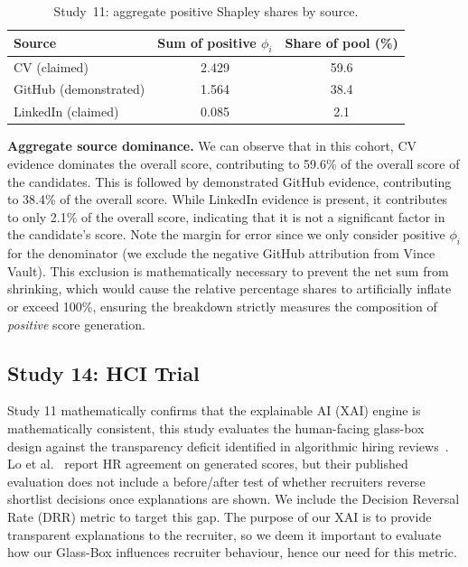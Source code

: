 \begin{table}[htbp]
    \centering
    \caption[Study~11: Aggregate Shapley by source]{Study~11: aggregate positive Shapley shares by source.}
    \label{tab:shapley-source-dominance}
    \vspace{1.5ex}
    \small
    \begin{tabular}{l c c}
        \toprule
        \textbf{Source} & \textbf{Sum of positive $\phi_i$} & \textbf{Share of pool (\%)} \\ \midrule
        CV (claimed)       & 2.429 & 59.6 \\
        GitHub (demonstrated) & 1.564 & 38.4 \\
        LinkedIn (claimed)    & 0.085 & 2.1 \\ \bottomrule
    \end{tabular}
\end{table}

\textbf{Aggregate source dominance.} We can observe that in this cohort, CV evidence dominates the overall score, contributing to 59.6\% of the overall score of 
the candidates. This is followed by demonstrated GitHub evidence, contributing to 38.4\% of the overall score.
While LinkedIn evidence is present, it contributes to only 2.1\% of the overall score, indicating that it is not a significant
factor in the candidate's score. Note the margin for error since we only consider positive $\phi_i$ for the denominator (we exclude the 
negative GitHub attribution from Vince Vault). This exclusion is mathematically necessary to prevent the net sum from shrinking, 
which would cause the relative percentage shares to artificially inflate or exceed 100\%, ensuring the breakdown strictly measures 
the composition of \textit{positive} score generation.

\subsection{Study 14: HCI Trial}
\label{subsec:hci-trial-protocol}

Study 11 mathematically confirms that the explainable AI (XAI) engine is mathematically consistent, this study evaluates the human-facing 
glass-box design against the transparency deficit identified in algorithmic hiring reviews~\cite{bogen2018,raghavan2020}.
Lo et al.~\cite{lo2025aihiring} report HR agreement on generated scores, but their published evaluation does not include a 
before/after test of whether recruiters reverse shortlist decisions once explanations are shown. 
We include the Decision Reversal Rate (DRR) metric to target this gap.
The purpose of our XAI is to provide transparent explanations to the recruiter, so we deem it important to evaluate
how our Glass-Box influences recruiter behaviour, hence our need for this metric.

